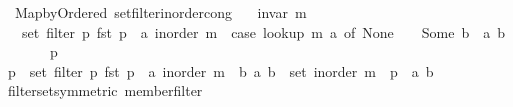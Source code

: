 \begin{isabellebody}
{\isafoldproof}%
%
\isadelimproof
\isanewline
%
\endisadelimproof
\isanewline
\isanewline
{}\isamarkupfalse%
\ {\isacharparenleft}{\kern0pt}\ Map{\isacharunderscore}{\kern0pt}by{\isacharunderscore}{\kern0pt}Ordered{\isacharparenright}{\kern0pt}\ set{\isacharunderscore}{\kern0pt}filter{\isacharunderscore}{\kern0pt}inorder{\isacharunderscore}{\kern0pt}cong{\isacharcolon}{\kern0pt}\isanewline
\ \ \ {\isachardoublequoteopen}invar\ m{\isachardoublequoteclose}\isanewline
\ \ \ {\isachardoublequoteopen}set\ {\isacharparenleft}{\kern0pt}filter\ {\isacharparenleft}{\kern0pt}{\isasymlambda}p{\isachardot}{\kern0pt}\ fst\ p\ {\isacharequal}{\kern0pt}\ a{\isacharparenright}{\kern0pt}\ {\isacharparenleft}{\kern0pt}inorder\ m{\isacharparenright}{\kern0pt}{\isacharparenright}{\kern0pt}\ {\isacharequal}{\kern0pt}\ {\isacharparenleft}{\kern0pt}case\ lookup\ m\ a\ of\ None\ {\isasymRightarrow}\ {\isacharbraceleft}{\kern0pt}{\isacharbraceright}{\kern0pt}\ {\isacharbar}{\kern0pt}\ Some\ b\ {\isasymRightarrow}\ {\isacharbraceleft}{\kern0pt}{\isacharparenleft}{\kern0pt}a{\isacharcomma}{\kern0pt}\ b{\isacharparenright}{\kern0pt}{\isacharbraceright}{\kern0pt}{\isacharparenright}{\kern0pt}{\isachardoublequoteclose}\isanewline
%
\isadelimproof
%
\endisadelimproof
%
\isatagproof
{}\isamarkupfalse%
\ {\isacharminus}{\kern0pt}\isanewline
\ \ \isacommand{{\isacharbraceleft}{\kern0pt}}\isamarkupfalse%
\ \isamarkupfalse%
\ p\isanewline
\ \ \ \ \isamarkupfalse%
\ {\isachardoublequoteopen}p\ {\isasymin}\ set\ {\isacharparenleft}{\kern0pt}filter\ {\isacharparenleft}{\kern0pt}{\isasymlambda}p{\isachardot}{\kern0pt}\ fst\ p\ {\isacharequal}{\kern0pt}\ a{\isacharparenright}{\kern0pt}\ {\isacharparenleft}{\kern0pt}inorder\ m{\isacharparenright}{\kern0pt}{\isacharparenright}{\kern0pt}\ {\isasymlongleftrightarrow}\ {\isacharparenleft}{\kern0pt}{\isasymexists}b{\isachardot}{\kern0pt}\ {\isacharparenleft}{\kern0pt}a{\isacharcomma}{\kern0pt}\ b{\isacharparenright}{\kern0pt}\ {\isasymin}\ set\ {\isacharparenleft}{\kern0pt}inorder\ m{\isacharparenright}{\kern0pt}\ {\isasymand}\ p\ {\isacharequal}{\kern0pt}\ {\isacharparenleft}{\kern0pt}a{\isacharcomma}{\kern0pt}\ b{\isacharparenright}{\kern0pt}{\isacharparenright}{\kern0pt}{\isachardoublequoteclose}\isanewline
\ \ \ \ \ \ \isamarkupfalse%
\ filter{\isacharunderscore}{\kern0pt}set{\isacharbrackleft}{\kern0pt}symmetric{\isacharbrackright}{\kern0pt}\ member{\isacharunderscore}{\kern0pt}filter\isanewline
\ \ \ \ \ \ \isamarkupfalse%

\end{isabellebody}
